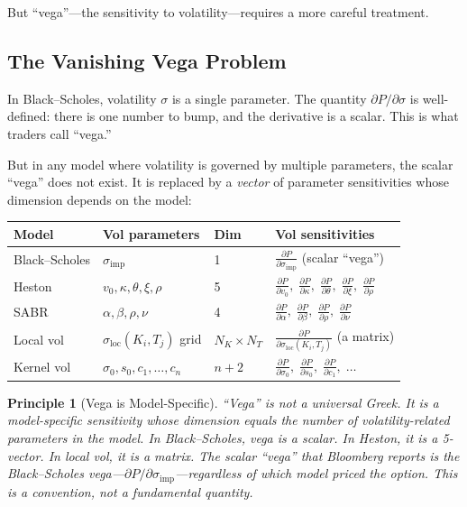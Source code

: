 \documentclass[11pt,a4paper]{article}
\newtheorem{principle}[definition]{Principle}
\begin{document}
But ``vega''---the sensitivity to volatility---requires a more careful treatment.

\subsection{The Vanishing Vega Problem}
\label{sec:vanishing-vega}

In Black--Scholes, volatility $\sigma$ is a single parameter.  The quantity $\partial P / \partial \sigma$ is well-defined: there is one number to bump, and the derivative is a scalar.  This is what traders call ``vega.''

But in any model where volatility is governed by multiple parameters, the scalar ``vega'' does not exist.  It is replaced by a \emph{vector} of parameter sensitivities whose dimension depends on the model:

\begin{center}
\small
\renewcommand{\arraystretch}{1.4}
\begin{tabular}{@{}l l l p{5cm}@{}}
\toprule
\textbf{Model} & \textbf{Vol parameters} & \textbf{Dim} & \textbf{Vol sensitivities} \\
\midrule
Black--Scholes & $\sigma_{\mathrm{imp}}$ & 1 & $\frac{\partial P}{\partial \sigma_{\mathrm{imp}}}$ (scalar ``vega'') \\[4pt]
Heston & $v_0, \kappa, \theta, \xi, \rho$ & 5 & $\frac{\partial P}{\partial v_0},\; \frac{\partial P}{\partial \kappa},\; \frac{\partial P}{\partial \theta},\; \frac{\partial P}{\partial \xi},\; \frac{\partial P}{\partial \rho}$ \\[4pt]
SABR & $\alpha, \beta, \rho, \nu$ & 4 & $\frac{\partial P}{\partial \alpha},\; \frac{\partial P}{\partial \beta},\; \frac{\partial P}{\partial \rho},\; \frac{\partial P}{\partial \nu}$ \\[4pt]
Local vol & $\sigma_{\mathrm{loc}}(K_i, T_j)$ grid & $N_K \times N_T$ & $\frac{\partial P}{\partial \sigma_{\mathrm{loc}}(K_i, T_j)}$ (a matrix) \\[4pt]
Kernel vol~\cite{implied_vol} & $\sigma_0, s_0, c_1, \ldots, c_n$ & $n+2$ & $\frac{\partial P}{\partial \sigma_0},\; \frac{\partial P}{\partial s_0},\; \frac{\partial P}{\partial c_1},\; \ldots$ \\[2pt]
\bottomrule
\end{tabular}
\end{center}

\begin{principle}[Vega is Model-Specific]
\label{princ:vega-model-specific}
``Vega'' is not a universal Greek.  It is a model-specific sensitivity whose dimension equals the number of volatility-related parameters in the model.  In Black--Scholes, vega is a scalar.  In Heston, it is a 5-vector.  In local vol, it is a matrix.  The scalar ``vega'' that Bloomberg reports is the Black--Scholes vega---$\partial P / \partial \sigma_{\mathrm{imp}}$---regardless of which model priced the option.  This is a \emph{convention}, not a fundamental quantity.
\end{principle}
\end{document}
